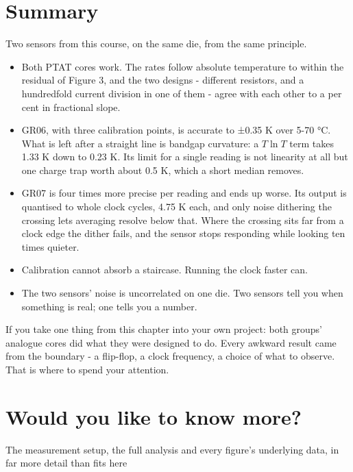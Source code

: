 \section{Summary}\label{summary}

Two sensors from this course, on the same die, from the same principle.

\begin{itemize}
\tightlist
\item
  Both PTAT cores work. The rates follow absolute temperature to within
  the residual of Figure 3, and the two designs - different resistors,
  and a hundredfold current division in one of them - agree with each
  other to a per cent in fractional slope.
\item
  GR06, with three calibration points, is accurate to ±0.35 K over 5-70
  °C. What is left after a straight line is bandgap curvature: a
  \(T\ln T\) term takes 1.33 K down to 0.23 K. Its limit for a single
  reading is not linearity at all but one charge trap worth about 0.5 K,
  which a short median removes.
\item
  GR07 is four times more precise per reading and ends up worse. Its
  output is quantised to whole clock cycles, 4.75 K each, and only noise
  dithering the crossing lets averaging resolve below that. Where the
  crossing sits far from a clock edge the dither fails, and the sensor
  stops responding while looking ten times quieter.
\item
  Calibration cannot absorb a staircase. Running the clock faster can.
\item
  The two sensors' noise is uncorrelated on one die. Two sensors tell
  you when something is real; one tells you a number.
\end{itemize}

If you take one thing from this chapter into your own project: both
groups' analogue cores did what they were designed to do. Every awkward
result came from the boundary - a flip-flop, a clock frequency, a choice
of what to observe. That is where to spend your attention.

\section{Would you like to know
more?}\label{would-you-like-to-know-more}

The measurement setup, the full analysis and every figure's underlying
data, in far more detail than fits here 

